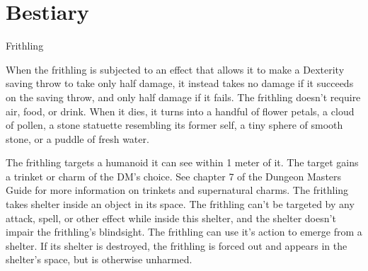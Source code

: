 \section{Bestiary}

\begin{DndMonster}[float*=b,width=\textwidth + 8pt]{Frithling} \label{creature::frithling}
\begin{multicols}{2}
    \DndMonsterBasics[
        armor-class = {15},
        hit-points  = {\DndDice{2d4}},
        speed       = {4 mt., climb 4 mt., swim 4 mt.},
    ]
    \DndMonsterAbilityScores[
        str = 1,
        dex = 20,
        con = 10,
        int = 14,
        wis = 16,
        cha = 16,
    ]
    \DndMonsterDetails[
        skills = {Acrobatics +7, Perception +7, Stealth +7},
        senses = {blindsight 12 mt., passive Perception 17},
        languages = {---},
        challenge = 0,
    ]

        When the frithling is subjected to an effect that allows it to make a Dexterity saving throw to take only half damage, it instead takes no damage if it succeeds on the saving throw, and only half damage if it fails.
        The frithling doesn't require air, food, or drink.
        When it dies, it turns into a handful of flower petals, a cloud of pollen, a stone statuette resembling its former self, a tiny sphere of smooth stone, or a puddle of fresh water.

        The frithling targets a humanoid it can see within 1 meter of it.
        The target gains a trinket or charm of the DM's choice.
        See chapter 7 of the Dungeon Masters Guide for more information on trinkets and supernatural charms.
        The frithling takes shelter inside an object in its space.
        The frithling can't be targeted by any attack, spell, or other effect while inside this shelter, and the shelter doesn't impair the frithling's blindsight.
        The frithling can use it's action to emerge from a shelter.
        If its shelter is destroyed, the frithling is forced out and appears in the shelter's space, but is otherwise unharmed.

\end{multicols}
\end{DndMonster}
